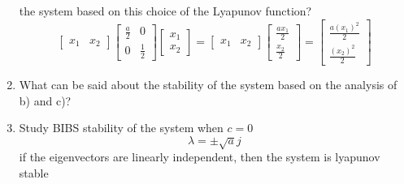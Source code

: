 \begin{enumerate}
    the system based on this choice of the Lyapunov function? \\
    \begin{equation}
      \begin{bmatrix}
        x_1 & x_2
      \end{bmatrix}
      \begin{bmatrix}
        \frac a 2 & 0 \\
        0 & \frac 1 2
      \end{bmatrix}
      \begin{bmatrix}
        x_1 \\
        x_2
      \end{bmatrix}=
      \begin{bmatrix}
        x_1 & x_2
      \end{bmatrix}
      \begin{bmatrix}
        \frac {ax_1} 2\\
        \frac {x_2} 2
      \end{bmatrix} = 
      \begin{bmatrix}
        \frac {a(x_1)^2} 2\\
        \frac {(x_2)^2} 2
      \end{bmatrix} 
    \end{equation}
    
  \item What can be said about the stability of the system based on the analysis of b) and c)?
  \item Study BIBS stability of the system when $c=0$ \\
    \begin{equation}
      \lambda = \pm \sqrt{a}j
    \end{equation}
    if the eigenvectors are linearly independent, then the system is lyapunov stable
  \end{enumerate}